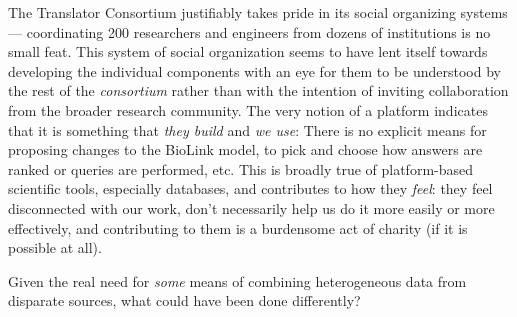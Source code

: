 The Translator Consortium justifiably takes pride in its social
organizing systems \citep{consortiumBiomedicalDataTranslator2019} 
--- coordinating 200 researchers and engineers from dozens of
institutions is no small feat. This system of social organization seems
to have lent itself towards developing the individual components with an
eye for them to be understood by the rest of the \emph{consortium}
rather than with the intention of inviting collaboration from the
broader research community. The very
notion of a platform indicates that it is something that \emph{they
build} and \emph{we use}: There is no explicit means for proposing
changes to the BioLink model, to pick and choose how answers are ranked
or queries are performed, etc. This is broadly true of platform-based
scientific tools, especially databases, and contributes to how they
\emph{feel}: they feel disconnected with our work, don't necessarily
help us do it more easily or more effectively, and contributing to them
is a burdensome act of charity (if it is possible at all).

Given the real need for \emph{some} means of combining heterogeneous
data from disparate sources, what could have been done differently?

